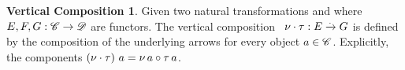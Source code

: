 \theoremstyle{definition}\newtheorem*{verticalcompositiondef}{Vertical Composition}

\begin{verticalcompositiondef}
    Given two natural transformations
     and
     where $\mathnormal{E, F, G}: \mathscr{C} \to
    \mathscr{D}$ are functors. The vertical
    composition~\cite{RelationalAlgebraByWayOfAdjunctions}
    $\nu \cdot \tau: \mathnormal{E} \xrightarrow{.} \mathnormal{G}$
    is defined by the composition of the underlying arrows for every
    object $\mathnormal{a} \in \mathscr{C}$. Explicitly, the components
    $\left(\nu \cdot \tau\right)\,\mathnormal{a} =
    \mathnormal{\nu\,\mathnormal{a}} \circ \mathnormal{\tau\,\mathnormal{a}}$.
\label{sec:verticalcomposition}
\end{verticalcompositiondef}


